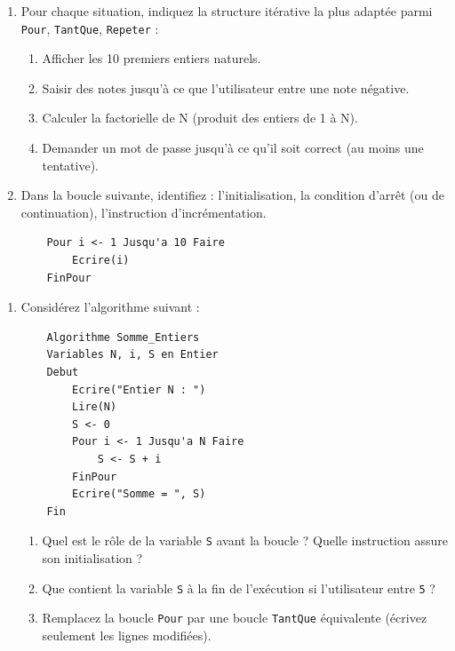 \documentclass[11pt]{article}
\begin{document}
\begin{exercice}
\begin{enumerate}
    \item Pour chaque situation, indiquez la structure itérative la plus adaptée parmi \texttt{Pour}, \texttt{TantQue}, \texttt{Repeter} : 
    \begin{enumerate}
        \item Afficher les 10 premiers entiers naturels.
        \item Saisir des notes jusqu'à ce que l'utilisateur entre une note négative.
        \item Calculer la factorielle de N (produit des entiers de 1 à N).
        \item Demander un mot de passe jusqu'à ce qu'il soit correct (au moins une tentative).
    \end{enumerate}
    \item Dans la boucle suivante, identifiez : l'initialisation, la condition d'arrêt (ou de continuation), l'instruction d'incrémentation.
    \begin{verbatim}
    Pour i <- 1 Jusqu'a 10 Faire
        Ecrire(i)
    FinPour
    \end{verbatim}
\end{enumerate}
\end{exercice}

\begin{exercice}
\begin{enumerate}
    \item Considérez l'algorithme suivant :
    \begin{verbatim}
    Algorithme Somme_Entiers
    Variables N, i, S en Entier
    Debut
        Ecrire("Entier N : ")
        Lire(N)
        S <- 0
        Pour i <- 1 Jusqu'a N Faire
            S <- S + i
        FinPour
        Ecrire("Somme = ", S)
    Fin
    \end{verbatim}
    \begin{enumerate}
        \item Quel est le rôle de la variable \texttt{S} avant la boucle ? Quelle instruction assure son initialisation ?
        \item Que contient la variable \texttt{S} à la fin de l'exécution si l'utilisateur entre \texttt{5} ?
        \item Remplacez la boucle \texttt{Pour} par une boucle \texttt{TantQue} équivalente (écrivez seulement les lignes modifiées).
    \end{enumerate}
\end{enumerate}
\end{exercice}
\end{document}
